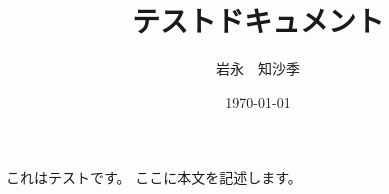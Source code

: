 \documentclass[uplatex]{jsarticle}
\title{テストドキュメント}
\author{岩永　知沙季}
\date{\today}
\begin{document}
\maketitle

これはテストです。
ここに本文を記述します。
\end{document}

